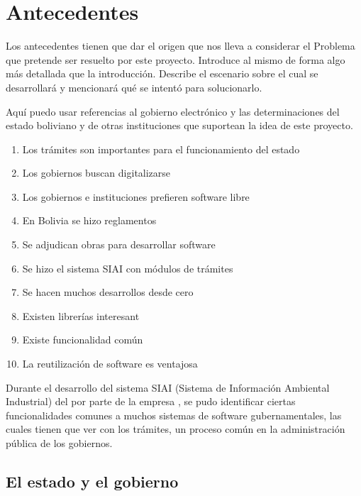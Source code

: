 \section{Antecedentes}

\begin{tcolorbox}[breakable]
    
    Los antecedentes tienen que dar el origen que nos lleva a considerar el Problema
    que pretende ser resuelto por este proyecto. Introduce al mismo de forma
    algo más detallada que la introducción.
    Describe el escenario sobre el cual se desarrollará y mencionará qué se intentó para solucionarlo.
    
    Aquí puedo usar referencias al gobierno electrónico y las determinaciones
    del estado boliviano y de otras instituciones que suportean la idea de este
    proyecto.

    \begin{enumerate}
        \item Los trámites son importantes para el funcionamiento del estado
        \item Los gobiernos buscan digitalizarse
        \item Los gobiernos e instituciones prefieren software libre
        \item En Bolivia se hizo reglamentos
        \item Se adjudican obras para desarrollar software
        \item Se hizo el sistema SIAI con módulos de trámites
        \item Se hacen muchos desarrollos desde cero
        \item Existen librerías interesant
        \item Existe funcionalidad común 
        \item La reutilización de software es ventajosa
    \end{enumerate}
    
\end{tcolorbox}

Durante el desarrollo del sistema SIAI (Sistema de Información Ambiental
Industrial) del  por parte
de la empresa , se pudo identificar ciertas funcionalidades comunes a muchos
sistemas de software gubernamentales, las cuales tienen que ver con los trámites, un proceso común en la administración pública de los gobiernos.

\subsection{El estado y el gobierno}

